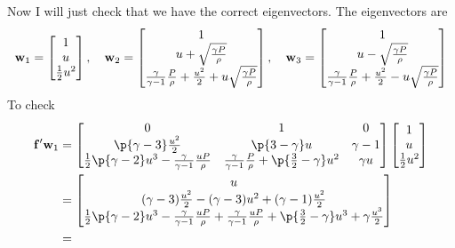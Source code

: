 \documentclass[11pt, oneside]{article}
\begin{document}
\begin{enumerate}
    Now I will just check that we have the correct eigenvectors.
    The eigenvectors are
    \[
      \mathbf{w}_1 =
      \begin{bmatrix}
        1 \\
        u \\
        \frac{1}{2}u^2
      \end{bmatrix}, \quad
      \mathbf{w}_2 =
      \begin{bmatrix}
        1 \\
        u + \sqrt{\frac{\gamma P}{\rho}} \\
        \frac{\gamma}{\gamma - 1}\frac{P}{\rho} + \frac{u^2}{2} + u\sqrt{\frac{\gamma P}{\rho}} \\
      \end{bmatrix}, \quad
      \mathbf{w}_3 =
      \begin{bmatrix}
        1 \\
        u - \sqrt{\frac{\gamma P}{\rho}} \\
        \frac{\gamma}{\gamma - 1}\frac{P}{\rho} + \frac{u^2}{2} - u\sqrt{\frac{\gamma P}{\rho}} \\
      \end{bmatrix}
    \]
    To check
    \begin{align*}
      \v{f}' \v{w}_1 &= 
      \begin{bmatrix}
        0 & 1 & 0 \\
        \p{\gamma - 3} \frac{u^2}{2} & \p{3 - \gamma}u & \gamma - 1 \\
        \frac{1}{2}\p{\gamma - 2} u^3 - \frac{\gamma}{\gamma - 1}\frac{uP}{\rho} & \frac{\gamma}{\gamma - 1}\frac{P}{\rho} + \p{\frac{3}{2} - \gamma}u^2  & \gamma u
      \end{bmatrix}
      \begin{bmatrix}
        1 \\
        u \\
        \frac{1}{2}u^2
      \end{bmatrix} \\
      &=
      \begin{bmatrix}
        u \\
        (\gamma - 3)\frac{u^2}{2} - (\gamma - 3)u^2 + (\gamma - 1)\frac{u^2}{2} \\
        \frac{1}{2}\p{\gamma - 2} u^3 - \frac{\gamma}{\gamma - 1}\frac{uP}{\rho} + \frac{\gamma}{\gamma - 1}\frac{uP}{\rho} + \p{\frac{3}{2} - \gamma}u^3 + \gamma \frac{u^3}{2}
      \end{bmatrix} \\
      &= 

\end{align*}
\end{enumerate}
\end{document}

